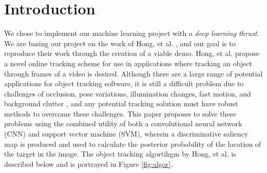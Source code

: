 \documentclass{sig-alternate-05-2015}
\begin{document}
\section{Introduction}
We chose to implement our machine learning project with a \textit{deep learning thrust}.
We are basing our project on the work of Hong, et al. \cite{hong2015online}, and our goal is to reproduce their work through the creation of a viable demo.
Hong, et al. propose a novel online tracking scheme for use in applications where tracking an object through frames of a video is desired.
Although there are a large range of potential applications for object tracking software, it is still a difficult problem due to challenges of occlusion, pose variations, illumination changes, fast motion, and background clutter \cite{hong2015online}, and any potential tracking solution must have robust methods to overcome these challenges.
This paper proposes to solve these problems using the combined utility of both a convolutional neural network (CNN) and support vector machine (SVM), wherein a discriminative saliency map is produced and used to calculate the posterior probability of the location of the target in the image.
The object tracking algortihgm by Hong, et al. is described below and is portrayed in Figure \ref{fig:algor}.
\end{document}
